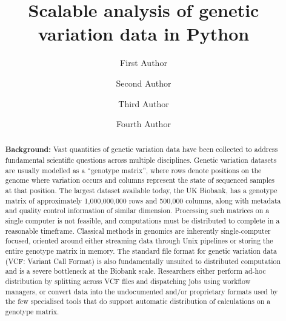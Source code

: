 \documentclass[a4paper,num-refs]{oup-contemporary}
\title{Scalable analysis of genetic variation data in Python}
\author[1,\authfn{1},\authfn{2}]{First Author}
\author[2,\authfn{1},\authfn{2}]{Second Author}
\author[2]{Third Author}
\author[2,\authfn{1}]{Fourth Author}
\affil[1]{First Institution}
\affil[2]{Second Institution}
\begin{document}
\begin{frontmatter}
\maketitle


\begin{abstract}
\textbf{Background:}
Vast quantities of genetic variation data have been collected to 
address fundamental scientific questions across multiple disciplines.
Genetic variation datasets are usually modelled as a ``genotype matrix'',
where rows denote positions on the genome where variation occurs and 
columns represent the state of sequenced samples at that position.
The largest dataset available today, the UK Biobank, 
has a genotype matrix of approximately 1,000,000,000 rows and 500,000 columns,
along with metadata and quality control information of similar dimension.
Processing such matrices on a single computer is not feasible,
and computations must be distributed to complete in a reasonable timeframe.
Classical methods in genomics are inherently single-computer focused, 
oriented around either streaming data through Unix pipelines or 
storing the entire genotype matrix in memory.
The standard file format for genetic variation data (VCF: Variant Call Format)
is also fundamentally unsuited to distributed computation and is a severe 
bottleneck at the Biobank scale.
Researchers either perform ad-hoc distribution by splitting across VCF files
and dispatching jobs using workflow managers, 
or convert data into the undocumented and/or proprietary formats 
used by the few specialised tools that do support automatic distribution
of calculations on a genotype matrix.


\end{abstract}
\end{frontmatter}
\end{document}
